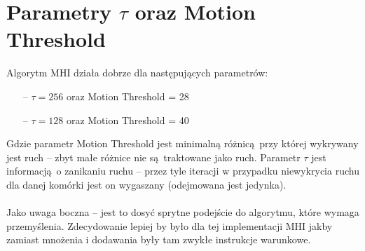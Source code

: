 \documentclass[a4paper, 12pt, titlepage]{article}
\begin{document}
    \section{Parametry $\tau$ oraz Motion Threshold}
        Algorytm MHI działa dobrze dla następujących parametrów:
        \begin{itemize}
            \item[--] $\tau=256$ oraz Motion Threshold = 28
            \item[--] $\tau=128$ oraz Motion Threshold = 40
        \end{itemize}
        Gdzie parametr Motion Threshold jest minimalną różnicą przy której wykrywany
        jest ruch -- zbyt małe różnice nie są traktowane jako ruch. Parametr $\tau$ 
        jest informacją o zanikaniu ruchu -- przez tyle iteracji w przypadku 
        niewykrycia ruchu dla danej komórki jest on wygaszany (odejmowana jest 
        jedynka).
        \\ \\
        Jako uwaga boczna -- jest to dosyć sprytne podejście do algorytmu, które wymaga
        przemyślenia. Zdecydowanie lepiej by było dla tej implementacji MHI jakby zamiast
        mnożenia i dodawania były tam zwykłe instrukcje warunkowe.
\end{document}
